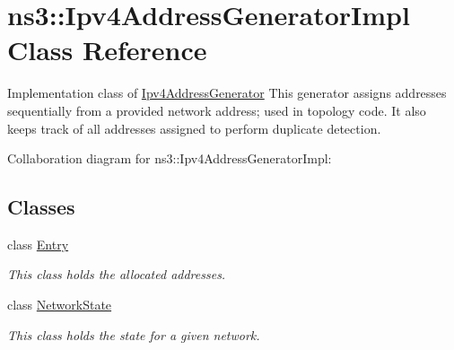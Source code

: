 \hypertarget{classns3_1_1Ipv4AddressGeneratorImpl}{}\section{ns3\+:\+:Ipv4\+Address\+Generator\+Impl Class Reference}
\label{classns3_1_1Ipv4AddressGeneratorImpl}


Implementation class of \hyperlink{classns3_1_1Ipv4AddressGenerator}{Ipv4\+Address\+Generator} This generator assigns addresses sequentially from a provided network address; used in topology code. It also keeps track of all addresses assigned to perform duplicate detection.  




Collaboration diagram for ns3\+:\+:Ipv4\+Address\+Generator\+Impl\+:
\subsection*{Classes}
\begin{DoxyCompactItemize}
\item 
class \hyperlink{classns3_1_1Ipv4AddressGeneratorImpl_1_1Entry}{Entry}
\begin{DoxyCompactList}\small\item\em This class holds the allocated addresses. \end{DoxyCompactList}\item 
class \hyperlink{classns3_1_1Ipv4AddressGeneratorImpl_1_1NetworkState}{Network\+State}
\begin{DoxyCompactList}\small\item\em This class holds the state for a given network. \end{DoxyCompactList}\end{DoxyCompactItemize}
